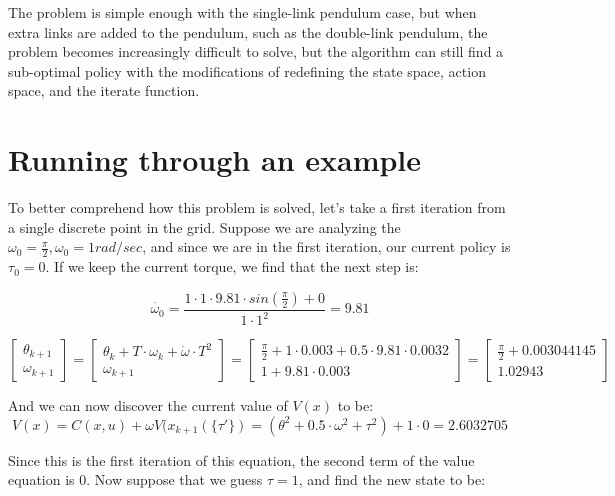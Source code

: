 \documentclass[12pt]{report}
\begin{document}
The problem is simple enough with the single-link pendulum case, but when extra links are added to the pendulum, such as the double-link pendulum, the problem becomes increasingly difficult to solve, but the algorithm can still find a sub-optimal policy with the modifications of redefining the state space, action space, and the iterate function.

\section{Running through an example}

To better comprehend how this problem is solved, let’s take a first iteration from a single discrete point in the grid. Suppose we are analyzing the $\omega_0=\frac{\pi}{2}, \omega_0=1 rad/sec$, and since we are in the first iteration, our current policy is $\tau_0=0$. If we keep the current torque, we find that the next step is:
	
\begin{equation} 
\dot{\omega_0} = \frac{1 \cdot 1 \cdot 9.81 \cdot sin(\frac{\pi}{2})+0}{1 \cdot 1^2} = 9.81
\end{equation}

\begin{equation} 
\begin{bmatrix}
\theta_{k+1} \\
\omega_{k+1}
\end{bmatrix}
=
\begin{bmatrix}
\theta_{k} + T \cdot \omega_{k} + \dot{\omega} \cdot T^2 \\
\omega_{k+1}
\end{bmatrix}
=
\begin{bmatrix}
\frac{\pi}{2}+1 \cdot 0.003 + 0.5 \cdot 9.81 \cdot 0.0032 \\
1 + 9.81 \cdot 0.003
\end{bmatrix}
=
\begin{bmatrix}
\frac{\pi}{2}+0.003044145 \\
1.02943
\end{bmatrix}
\end{equation}

And we can now discover the current value of $V(x)$ to be:
\begin{equation} 
V(x) = C(x,u) + \omega V(x_{k+1}(\{\tau'\})=(\theta^2+0.5 \cdot \omega^2 + \tau^2)+1 \cdot 0 = 2.6032705
\end{equation}

Since this is the first iteration of this equation, the second term of the value equation is 0. Now suppose that we guess $\tau=1$, and find the new state to be:
\end{document}
